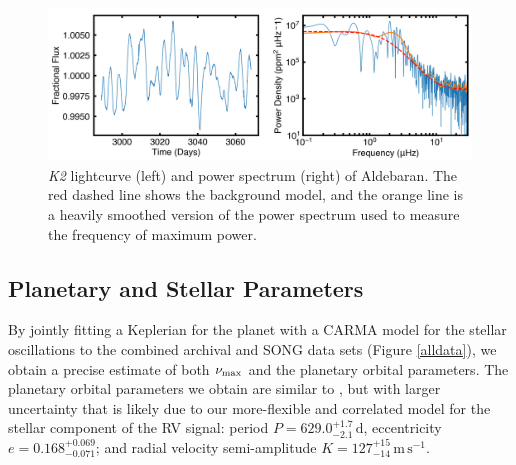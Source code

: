 \documentclass[modern]{aastex61}
\newcommand{\numax}{\mbox{$\nu_{\rm max}$}\xspace}
\newcommand{\ktwo}{\emph{K2}\xspace}
\newcommand{\twosidedrange}[3]{\ensuremath{#1^{+#2}_{-#3}}}
\newcommand{\PeriodRange}{\twosidedrange{629.0}{1.7}{2.1}}
\newcommand{\EccentricityRange}{\twosidedrange{0.168}{0.069}{0.071}}
\newcommand{\PlanetRVAmpRange}{\twosidedrange{127}{15}{14}}
\begin{document}
\begin{figure}
\centering
\includegraphics[width=\textwidth]{k2obs.png}
\caption{\ktwo lightcurve (left) and power spectrum (right) of Aldebaran. The red dashed line shows the background model, and the orange line is a heavily smoothed version of the power spectrum used to measure the frequency of maximum power. }
\label{k2_lightcurve}
\end{figure}

\subsection{Planetary and Stellar Parameters}
\label{sec:planet-star-parameters}

By jointly fitting a Keplerian for the planet with a CARMA model for the stellar
oscillations to the combined archival and SONG data sets (Figure \ref{alldata}),
we obtain a precise estimate of both \numax and the planetary orbital
parameters. The planetary orbital parameters we obtain are similar to
\citet{Hatzes2015}, but with larger uncertainty that is likely due to our
more-flexible and correlated model for the stellar component of the RV signal:
period $P = \PeriodRange \, \mathrm{d}$, eccentricity $e =
\EccentricityRange{}$; and radial velocity semi-amplitude $K =
\PlanetRVAmpRange{} \, \mathrm{m} \, \mathrm{s}^{-1}$.
\end{document}
